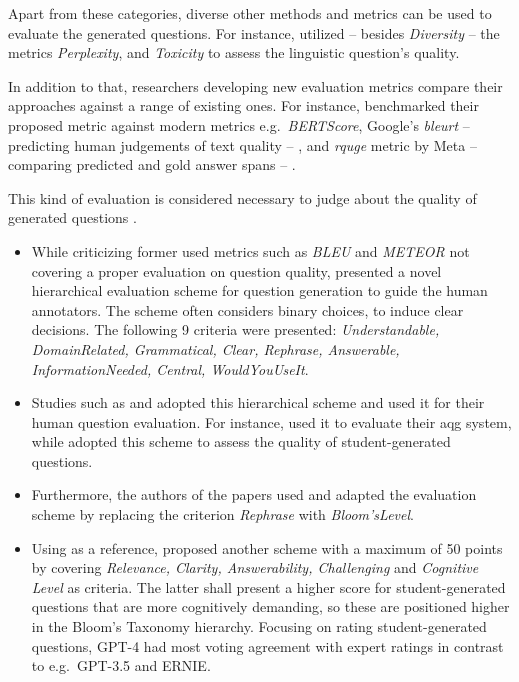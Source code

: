  Apart from these categories, diverse other methods and metrics can be used to evaluate the generated questions. For instance, \cite{yang_heuristic_2024} utilized -- besides \textit{Diversity} -- the metrics \textit{Perplexity}, and \textit{Toxicity} to assess the linguistic question's quality. 

In addition to that, researchers developing new evaluation metrics compare their approaches against a range of existing ones. For instance, \cite{nguyen_reference-based_2024} benchmarked their proposed metric against modern metrics e.g.\ \textit{BERTScore}, Google's \textit{\ac{bleurt}} -- predicting human judgements of text quality -- \cite{sellam_bleurt_2020}, and \textit{\ac{rquge}} metric by Meta -- comparing predicted and gold answer spans -- \cite{mohammadshahi_rquge_2023}.

\pagebreak

 This kind of evaluation is considered necessary to judge about the quality of generated questions \cite{horbach_linguistic_2020}.

\begin{itemize}
   \item While criticizing former used metrics such as \textit{BLEU} and \textit{METEOR} not covering a proper evaluation on question quality, \cite{horbach_linguistic_2020} presented a novel hierarchical evaluation scheme for question generation to guide the human annotators. The scheme often considers binary choices, to induce clear decisions. The following 9 criteria were presented: \textit{Understandable, DomainRelated, Grammatical, Clear, Rephrase, Answerable, InformationNeeded, Central, WouldYouUseIt}. 
   \item Studies such as \cite{steuer_i_2021} and \cite{moore_assessing_2022} adopted this hierarchical scheme and used it for their human question evaluation. For instance, \cite{steuer_i_2021} used it to evaluate their \ac{aqg} system, while \cite{moore_assessing_2022} adopted this scheme to assess the quality of student-generated questions.
   \item Furthermore, the authors of the papers \cite{scaria_how_2024,scaria_automated_2024} used and adapted the evaluation scheme by replacing the criterion \textit{Rephrase} with \textit{Bloom'sLevel}.
   \item Using \cite{moore_assessing_2022} as a reference, \cite{mi_comparative_2024} proposed another scheme with a maximum of 50 points by covering \textit{Relevance, Clarity, Answerability, Challenging} and \textit{Cognitive Level} as criteria. The latter shall present a higher score for student-generated questions that are more cognitively demanding, so these are positioned higher in the Bloom's Taxonomy hierarchy. Focusing on rating student-generated questions, GPT-4 had most voting agreement with expert ratings in contrast to e.g.\ GPT-3.5 and ERNIE.
\end{itemize}

